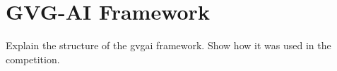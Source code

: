 \section{GVG-AI Framework}\label{s:framework}
Explain the structure of the \ac{gvgai} framework. Show how it was used in the competition.